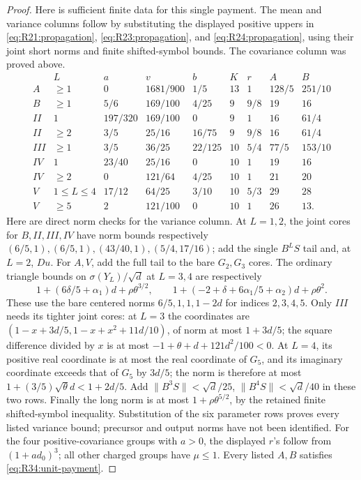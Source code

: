 \begin{proof}
Here is sufficient finite data for this single payment. The mean and
variance columns follow by substituting the displayed positive uppers
in \eqref{eq:R21:propagation}, \eqref{eq:R23:propagation}, and
\eqref{eq:R24:propagation}, using their joint short norms and finite
shifted-symbol bounds. The covariance column was proved above.
\[
\begin{array}{c|c|c|c|c|c|c|c|c}
 &L&a&v&b&K&r&A&B\\\hline
A&\ge1&0&1681/900&1/5&13&1&128/5&251/10\\
B&\ge1&5/6&169/100&4/25&9&9/8&19&16\\
II&1&197/320&169/100&0&9&1&16&61/4\\
II&\ge2&3/5&25/16&16/75&9&9/8&16&61/4\\
III&\ge1&3/5&36/25&22/125&10&5/4&77/5&153/10\\
IV&1&23/40&25/16&0&10&1&19&16\\
IV&\ge2&0&121/64&4/25&10&1&21&20\\
V&1\le L\le4&17/12&64/25&3/10&10&5/3&29&28\\
V&\ge5&2&121/100&0&10&1&26&13.
\end{array}
\]
Here are direct norm checks for the variance column. At \(L=1,2\),
the joint cores for \(B,II,III,IV\) have norm bounds respectively
\((6/5,1),(6/5,1),(43/40,1),(5/4,17/16)\); add the single
\(B^LS\) tail and, at \(L=2\), \(Du\).
For \(A,V\), add the full tail to the bare \(G_2,G_3\) cores.
The ordinary triangle bounds on \(\sigma(Y_L)/\sqrt d\) at
\(L=3,4\) are respectively
\[
 1+(6\delta/5+\alpha_1)d+\rho\theta^{3/2},\qquad
 1+(-2+\delta+6\alpha_1/5+\alpha_2)d+\rho\theta^2.
\]
These use the bare centered norms \(6/5,1,1,1-2d\) for indices
\(2,3,4,5\). Only \(III\) needs its tighter joint cores:
at \(L=3\) the coordinates are
\((1-x+3d/5,1-x+x^2+11d/10)\), of norm at most \(1+3d/5\);
the square difference divided by \(x\) is at most
\(-1+\theta+d+121d^2/100<0\).
At \(L=4\), its positive real coordinate is at most the real
coordinate of \(G_5\), and its imaginary coordinate exceeds that
of \(G_5\) by \(3d/5\); the norm is therefore at most
\(1+(3/5)\sqrt\theta d<1+2d/5\).
Add \(\|B^3S\|<\sqrt d/25\),
\(\|B^4S\|<\sqrt d/40\) in these two rows.
Finally the long norm is at most \(1+\rho\theta^{5/2}\), by the
retained finite shifted-symbol inequality. Substitution of the six
parameter rows proves every listed variance bound; precursor and
output norms have not been identified.
For the four positive-covariance groups with \(a>0\), the displayed
\(r\)'s follow from \((1+ad_0)^3\); all other charged groups have
\(\mu\le1\). Every listed \(A,B\) satisfies
\eqref{eq:R34:unit-payment}.


\end{proof}
